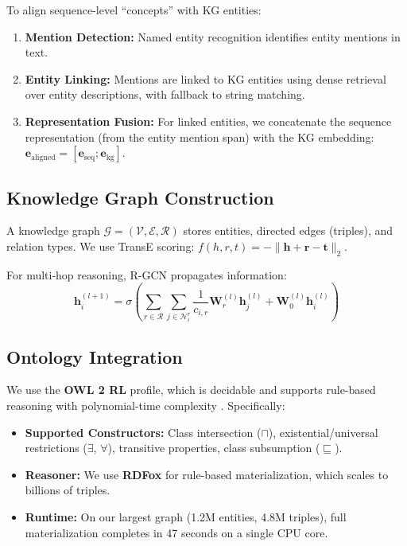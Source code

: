 \documentclass[conference]{IEEEtran}
\begin{document}
To align sequence-level ``concepts'' with KG entities:

\begin{enumerate}[leftmargin=*]
    \item \textbf{Mention Detection:} Named entity recognition identifies entity mentions in text.
    \item \textbf{Entity Linking:} Mentions are linked to KG entities using dense retrieval over entity descriptions, with fallback to string matching.
    \item \textbf{Representation Fusion:} For linked entities, we concatenate the sequence representation (from the entity mention span) with the KG embedding: $\mathbf{e}_{\text{aligned}} = [\mathbf{e}_{\text{seq}}; \mathbf{e}_{\text{kg}}]$.
\end{enumerate}

\subsection{Knowledge Graph Construction}

A knowledge graph $\mathcal{G} = (\mathcal{V}, \mathcal{E}, \mathcal{R})$ stores entities, directed edges (triples), and relation types. We use TransE scoring: $f(h, r, t) = -\|\mathbf{h} + \mathbf{r} - \mathbf{t}\|_2$.

For multi-hop reasoning, R-GCN propagates information:
\begin{equation}
\mathbf{h}_i^{(l+1)} = \sigma\left(\sum_{r \in \mathcal{R}} \sum_{j \in \mathcal{N}_i^r} \frac{1}{c_{i,r}} \mathbf{W}_r^{(l)} \mathbf{h}_j^{(l)} + \mathbf{W}_0^{(l)} \mathbf{h}_i^{(l)}\right)
\end{equation}

\subsection{Ontology Integration}
\label{sec:owl2rl}

We use the \textbf{OWL 2 RL} profile, which is decidable and supports rule-based reasoning with polynomial-time complexity \cite{motik2012owl}. Specifically:

\begin{itemize}[leftmargin=*]
    \item \textbf{Supported Constructors:} Class intersection ($\sqcap$), existential/universal restrictions ($\exists$, $\forall$), transitive properties, class subsumption ($\sqsubseteq$).
    \item \textbf{Reasoner:} We use \textbf{RDFox} \cite{nenov2015rdfox} for rule-based materialization, which scales to billions of triples.
    \item \textbf{Runtime:} On our largest graph (1.2M entities, 4.8M triples), full materialization completes in 47 seconds on a single CPU core.
\end{itemize}
\end{document}
